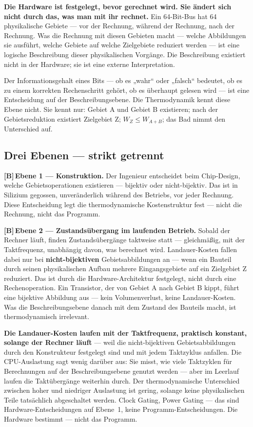 \documentclass[11pt,a4paper]{article}
\newcommand{\LB}{\textcolor{layB}{\textbf{\footnotesize\textsf{[B]}}}\,}
\begin{document}
\textbf{Die Hardware ist festgelegt, bevor gerechnet wird. Sie ändert sich nicht
durch das, was man mit ihr rechnet.} Ein 64-Bit-Bus hat 64 physikalische Gebiete
--- vor der Rechnung, während der Rechnung, nach der Rechnung. Was die Rechnung
mit diesen Gebieten macht --- welche Abbildungen sie ausführt, welche Gebiete auf
welche Zielgebiete reduziert werden --- ist eine logische Beschreibung dieser
physikalischen Vorgänge. Die Beschreibung existiert nicht in der Hardware; sie ist
eine externe Interpretation.

Der Informationsgehalt eines Bits --- ob es „wahr“ oder „falsch“ bedeutet, ob es
zu einem korrekten Rechenschritt gehört, ob es überhaupt gelesen wird --- ist eine
Entscheidung auf der Beschreibungsebene. Die Thermodynamik kennt diese Ebene
nicht. Sie kennt nur: Gebiet A und Gebiet B existieren; nach der Gebietsreduktion
existiert Zielgebiet Z; $W_Z \le W_{A+B}$; das Bad nimmt den Unterschied auf.

\subsection{Drei Ebenen --- strikt getrennt}

\LB \textbf{Ebene 1 --- Konstruktion.} Der Ingenieur entscheidet beim Chip-Design,
welche Gebietsoperationen existieren --- bijektiv oder nicht-bijektiv. Das ist in
Silizium gegossen, unveränderlich während des Betriebs, vor jeder Rechnung. Diese
Entscheidung legt die thermodynamische Kostenstruktur fest --- nicht die Rechnung,
nicht das Programm.

\LB \textbf{Ebene 2 --- Zustandsübergang im laufenden Betrieb.} Sobald der Rechner
läuft, finden Zustandsübergänge taktweise statt --- gleichmäßig, mit der
Taktfrequenz, unabhängig davon, was berechnet wird. Landauer-Kosten fallen dabei
nur bei \textbf{nicht-bijektiven} Gebietsabbildungen an --- wenn ein Bauteil durch
seinen physikalischen Aufbau mehrere Eingangsgebiete auf ein Zielgebiet Z
reduziert. Das ist durch die Hardware-Architektur festgelegt, nicht durch eine
Rechenoperation. Ein Transistor, der von Gebiet A nach Gebiet B kippt, führt eine
bijektive Abbildung aus --- kein Volumenverlust, keine Landauer-Kosten. Was die
Beschreibungsebene danach mit dem Zustand des Bauteils macht, ist thermodynamisch
irrelevant.

\textbf{Die Landauer-Kosten laufen mit der Taktfrequenz, praktisch konstant,
solange der Rechner läuft} --- weil die nicht-bijektiven Gebietsabbildungen durch
den Konstrukteur festgelegt sind und mit jedem Taktzyklus anfallen. Die
CPU-Auslastung sagt wenig darüber aus: Sie misst, wie viele Taktzyklen für
Berechnungen auf der Beschreibungsebene genutzt werden --- aber im Leerlauf laufen
die Taktübergänge weiterhin durch. Der thermodynamische Unterschied zwischen hoher
und niedriger Auslastung ist gering, solange keine physikalischen Teile
tatsächlich abgeschaltet werden. Clock Gating, Power Gating --- das sind
Hardware-Entscheidungen auf Ebene~1, keine Programm-Entscheidungen. Die Hardware
bestimmt --- nicht das Programm.
\end{document}
